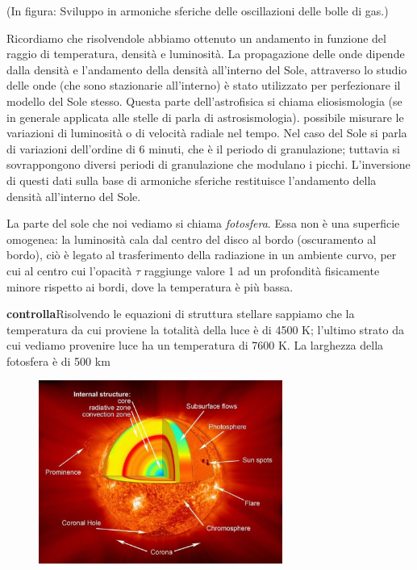 (In figura: Sviluppo in armoniche sferiche delle oscillazioni delle bolle di gas.)

Ricordiamo che risolvendole abbiamo ottenuto un andamento in funzione del raggio di temperatura, densità e luminosità. La propagazione delle onde dipende dalla densità e l'andamento della densità all'interno del Sole, attraverso lo studio delle onde (che sono stazionarie all'interno) è stato utilizzato per perfezionare il modello del Sole stesso. Questa parte dell'astrofisica si chiama eliosismologia (se in generale applicata alle stelle di parla di astrosismologia). \E possibile misurare le variazioni di luminosità o di velocità radiale nel tempo. Nel caso del Sole si parla di variazioni dell'ordine di 6 minuti, che è il periodo di granulazione; tuttavia si sovrappongono diversi periodi di granulazione che modulano i picchi. L'inversione di questi dati sulla base di armoniche sferiche restituisce l'andamento della densità all'interno del Sole.

\vspace{0.2cm}La parte del sole che noi vediamo si chiama \textit{fotosfera}. Essa non è una superficie omogenea: la luminosità cala dal centro del disco al bordo (oscuramento al bordo), ciò è legato al trasferimento della radiazione in un ambiente curvo, per cui al centro cui l'opacità $\tau$ raggiunge valore 1 ad un profondità fisicamente minore rispetto ai bordi, dove la temperatura è più bassa. 

\textbf{controlla}Risolvendo le equazioni di struttura stellare sappiamo che la temperatura da cui proviene la totalità della luce è di 4500 K; l'ultimo strato da cui vediamo provenire luce ha un temperatura di 7600 K. La larghezza della fotosfera è di 500 km

\begin{figure}[H]
    \centering
    \includegraphics[width=8cm]{2dic/StrutturaSole.jpg}
    \label{fig:StruttSole}
\end{figure}

